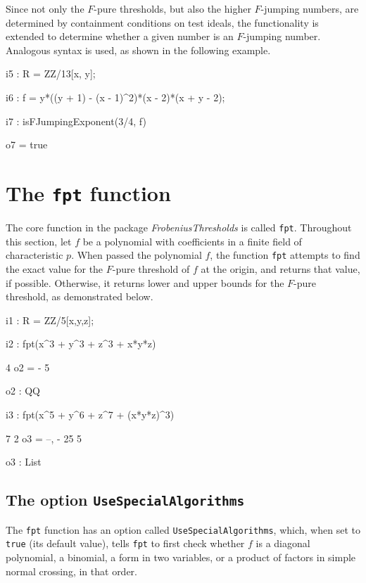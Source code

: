 \documentclass{amsart}
\begin{document}
Since not only the $F$-pure thresholds, but also the higher $F$-jumping numbers, are determined by containment conditions on test ideals, the functionality is extended to determine whether a given number is an $F$-jumping number.
Analogous syntax is used, as shown in the following example.

\medskip
{\small
{}
\begin{MyVerbatim}
i5 : R = ZZ/13[x, y];

i6 : f = y*((y + 1) - (x - 1)^2)*(x - 2)*(x + y - 2);

i7 : isFJumpingExponent(3/4, f)

o7 = true
\end{MyVerbatim}
}


\section{The {\tt fpt} function}
\label{sec.FPT}

The core function in the package \emph{FrobeniusThresholds} is called \texttt{fpt}.  Throughout this section, let $f$ be a polynomial with coefficients in a finite field of characteristic $p$. When passed the polynomial $f$, the function \texttt{fpt} attempts to find the exact value for the $F$-pure threshold of $f$ at the origin, and returns that value, if possible.  Otherwise, it returns lower and upper bounds for the $F$-pure threshold, as demonstrated below.

\medskip
{\small
{}
\begin{MyVerbatim}
i1 : R = ZZ/5[x,y,z];

i2 : fpt(x^3 + y^3 + z^3 + x*y*z)

     4
o2 = -
     5

o2 : QQ

i3 : fpt(x^5 + y^6 + z^7 + (x*y*z)^3)

       7  2
o3 = {--, -}
      25  5

o3 : List
\end{MyVerbatim}
}


\subsection{The option \texttt{UseSpecialAlgorithms}}\label{ss: UseSpecialAlgorithms}

The \texttt{fpt} function has an option called \texttt{UseSpecialAlgorithms}, which, when set to \texttt{true} (its default value), tells \texttt{fpt} to first check whether $f$ is a diagonal polynomial, a binomial, a form in two variables, or a product of factors in simple normal crossing, in that order.
\end{document}
